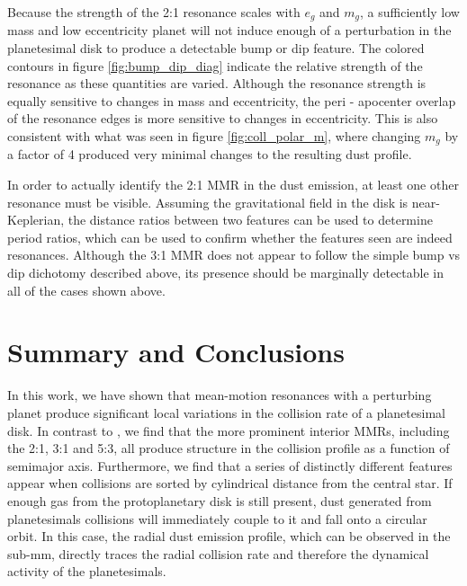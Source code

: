 \documentclass[twocolumn]{aastex63}
\begin{document}
Because the strength of the 2:1 resonance scales with $e_{g}$ and  $m_{g}$, a sufficiently low mass and low eccentricity planet will not induce 
enough of a perturbation in the planetesimal disk to produce a detectable bump or dip feature. The colored contours in figure \ref{fig:bump_dip_diag} 
indicate the relative strength of the resonance as these quantities are varied. Although the resonance strength is equally sensitive to changes in 
mass and eccentricity, the peri - apocenter overlap of the resonance edges is more sensitive to changes in eccentricity. This is also consistent with 
what was seen in figure \ref{fig:coll_polar_m}, where changing $m_{g}$ by a factor of 4 produced very minimal changes to the resulting dust profile.

In order to actually identify the 2:1 MMR in the dust emission, at least one other resonance must be visible. Assuming the gravitational field in the 
disk is near-Keplerian, the distance ratios between two features can be used to determine period ratios, which can be used to confirm whether the 
features seen are indeed resonances. Although the 3:1 MMR does not appear to follow the simple bump vs dip dichotomy described above, its 
presence should be marginally detectable in all of the cases shown above.

\section{Summary and Conclusions}\label{sec:conclusions}

In this work, we have shown that mean-motion resonances with a perturbing planet produce significant local variations in the collision rate of a 
planetesimal disk. In contrast to \citet{2000Icar..143...45R}, we find that the more prominent interior MMRs, including the 2:1, 3:1 and 5:3, all 
produce structure in the collision profile as a function of semimajor axis. Furthermore, we find that a series of distinctly different features appear 
when collisions are sorted by cylindrical distance from the central star. If enough gas from the protoplanetary disk is still present, dust generated 
from planetesimals collisions will immediately couple to it and fall onto a circular orbit. In this case, the radial dust emission profile, which can be 
observed in the sub-mm, directly traces the radial collision rate and therefore the dynamical activity of the planetesimals.
\end{document}
